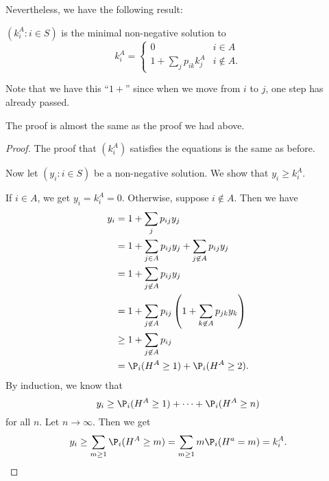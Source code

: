 \documentclass[a4paper]{article}
\begin{document}
Nevertheless, we have the following result:
\begin{thm}[]
  $(k_i^A: i \in S)$ is the minimal non-negative solution to
  \[
    k_i^A =
    \begin{cases}
      0 & i \in A\\
      1 + \sum_j p_{ik}k_j^A & i \not\in A.
    \end{cases}
  \]
\end{thm}
Note that we have this ``$1 +$'' since when we move from $i$ to $j$, one step has already passed.

The proof is almost the same as the proof we had above.
\begin{proof}
  The proof that $(k_i^A)$ satisfies the equations is the same as before.

  Now let $(y_i : i\in S)$ be a non-negative solution. We show that $y_i \geq k_i^A$.

  If $i \in A$, we get $y_i = k_i^A = 0$. Otherwise, suppose $i\not\in A$. Then we have
  \begin{align*}
    y_i &= 1 + \sum_j p_{ij}y_j\\
    &= 1 + \sum_{j \in A}p_{ij}y_j + \sum_{j\not\in A}p_{ij}y_j\\
    &= 1 + \sum_{j\not\in A}p_{ij}y_j\\
    &= 1 + \sum_{j \not\in A}p_{ij}\left(1 + \sum_{k\not\in A} p_{jk}y_k\right)\\
    &\geq 1 + \sum_{j \not\in A} p_{ij}\\
    &= \P_i(H^A \geq 1) + \P_i(H^A \geq 2).
  \end{align*}
  By induction, we know that
  \[
    y_i \geq \P_i (H^A \geq 1) + \cdots + \P_i(H^A \geq n)
  \]
  for all $n$. Let $ n\to \infty$. Then we get
  \[
    y_i \geq \sum_{m \geq 1}\P_i(H^A \geq m) = \sum_{m \geq 1} m\P_i(H^a = m)= k_i^A.
  \]
\end{proof}
\end{document}
